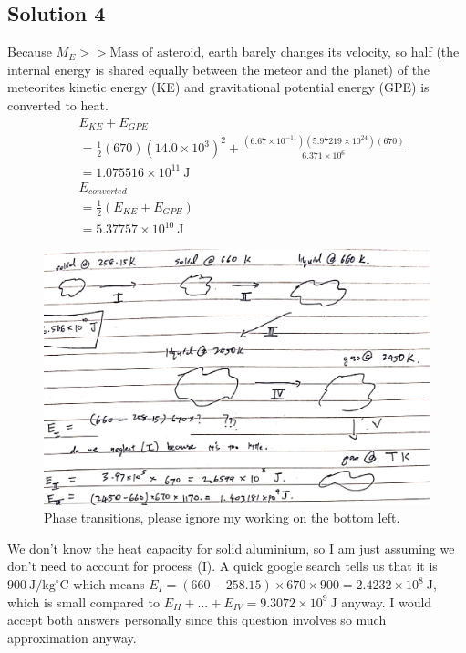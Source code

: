 \documentclass{article}
\begin{document}
\subsection{Solution 4}
Because $M_E >> \text{Mass of asteroid}$, earth barely changes its velocity, so half (the internal energy is shared equally between the meteor and the planet) of the meteorites kinetic energy (KE) and gravitational potential energy (GPE) is converted to heat.
\begin{equation}
	\begin{aligned}
		&E_{KE} + E_{GPE} \\
		&=\frac{1}{2}(670)\left(14.0 \times 10^{3}\right)^{2} + \frac{(6.67\times 10^{-11}) (5.97219\times10^24) (670)}{6.371 \times 10^6} \\
		&=1.075516 \times 10^{11} \mathrm{~J} \\
		&E_{converted} \\
		&=\frac{1}{2} (E_{KE} + E_{GPE}) \\
		&=5.37757 \times 10^{10} \mathrm{~J}
	\end{aligned}
\end{equation}
\begin{figure}
	\centering
	\includegraphics[width=0.9\linewidth]{spho_book_TYS_images/2010q4.png}
	\caption{Phase transitions, please ignore my working on the bottom left.}
\end{figure}
We don't know the heat capacity for solid aluminium, so I am just assuming we don't need to account for process (I). A quick google search tells us that it is $900 \mathrm{~J} / \mathrm{kg}^{\circ} \mathrm{C}$ which means $E_{I} = (660-258.15) \times 670 \times 900 = 2.4232 \times 10^{8} \mathrm{~J}$, which is small compared to $E_{II}+...+E_{IV}=9.3072 \times 10^9 \mathrm{~J}$ anyway. I would accept both answers personally since this question involves so much approximation anyway.
\end{document}
